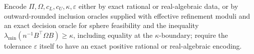 Encode \(\Pi,\Omega,c_L,c_U,\kappa,\varepsilon\) either by exact rational or real-algebraic data, or by outward-rounded inclusion oracles supplied with effective refinement moduli and an exact decision oracle for sphere feasibility and the inequality \(\lambda_{\min}(n^{-1}B^{\top}\Omega B)\ge\kappa\), including equality at the \(\kappa\)-boundary; require the tolerance \(\varepsilon\) itself to have an exact positive rational or real-algebraic encoding.
